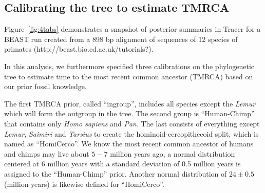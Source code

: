 \documentclass{bioinfo}
\begin{document}

\subsection*{Calibrating the tree to estimate TMRCA}

Figure~\ref{fig:4tabs} demonstrates a snapshot of posterior summaries in Tracer for a BEAST \citep{drummond2012bayesian} run created from a 898 bp alignment of sequences of 12 species of primates (http://beast.bio.ed.ac.uk/tutorials?). %

In this analysis, we furthermore specified three calibrations on the phylogenetic tree to estimate time to the most recent common ancestor (TMRCA) based on our prior fossil knowledge.

The first TMRCA prior, called ``ingroup'', includes all species except the \textit{Lemur} which will form the outgroup in the tree. %
The second group is ``Human-Chimp'' that contains only \textit{Homo sapiens} and \textit{Pan}.
The last consists of everything except \textit{Lemur}, \textit{Saimiri} and \textit{Tarsius} to create the hominoid-cercopithecoid split, which is named as ``HomiCerco''.
We know the most recent common ancestor of humans and chimps may live about $5-7$ million years ago, a normal distribution centered at 6 million years with a standard deviation of 0.5 million years is assigned to the ``Human-Chimp'' prior.
Another normal distribution of $24 \pm 0.5$ (million years) is likewise defined for ``HomiCerco''.
\end{document}

